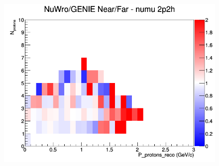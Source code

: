 \begin{figure}[h]
\endminipage
{}
\includegraphics[width=\linewidth]{eff_N_P/LAr/protons/ratios/2p2h_NuWro_GENIE_numu_NF_N_P.png}
\endminipage
\newline
\end{figure}
\clearpage
